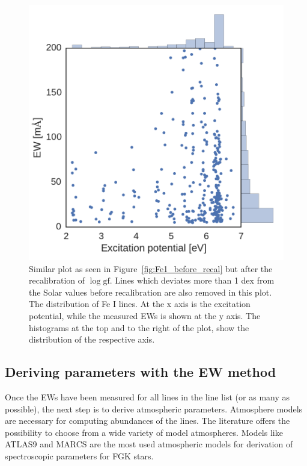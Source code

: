 \documentclass{aa}
\begin{document}
\begin{figure}[tpb]
    \centering
    \includegraphics[width=1.0\linewidth]{figures/EWvsEP_cut.pdf}
    \caption{Similar plot as seen in Figure~\ref{fig:Fe1_before_recal}
    but after the recalibration of $\log \mathrm{gf}$. Lines which
    deviates more than 1 dex from the Solar values before recalibration
    are also removed in this plot. The distribution of Fe I lines. At
    the x axis is the excitation potential, while the measured EWs is
    shown at the y axis. The histograms at the top and to the right of
    the plot, show the distribution of the respective axis.}
    \label{fig:Fe1_after_recal}
\end{figure}



\subsection{Deriving parameters with the EW method}
\label{sec:deriving_parameters_with_the_ew_method}

Once the EWs have been measured for all lines in the line list (or as
many as possible), the next step is to derive atmospheric parameters.
Atmosphere models are necessary for computing abundances of the lines.
The literature offers the possibility to choose from a wide variety
of model atmospheres. Models like ATLAS9 \citep{Kurucz1993} and
MARCS \citep{Gustafson2008} are the most used atmospheric models for
derivation of spectroscopic parameters for FGK stars.
\end{document}
